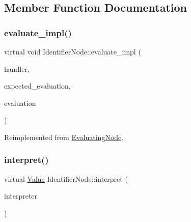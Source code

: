 \subsection{Member Function Documentation}
\mbox{\label{classIdentifierNode_a4960a1e68623066e413f8c2d68cee7e5}} 
\subsubsection{\texorpdfstring{evaluate\+\_\+impl()}{evaluate\_impl()}}
{\footnotesize\ttfamily virtual void Identifier\+Node\+::evaluate\+\_\+impl (\begin{DoxyParamCaption}\item[{\hyperlink{classSystemHandler}{System\+Handler} $\ast$}]{handler,  }\item[{\hyperlink{statics_8h_a6664c451ca7787483a7981cc1de68dbb}{E\+V\+A\+L\+U\+A\+T\+I\+O\+N\+\_\+\+T\+Y\+PE}}]{expected\+\_\+evaluation,  }\item[{struct \hyperlink{structEvaluation}{Evaluation} $\ast$}]{evaluation }\end{DoxyParamCaption})\hspace{0.3cm}{\ttfamily [virtual]}}



Reimplemented from \hyperlink{classEvaluatingNode_abb86fa7334a5871f959b0633db3b5215}{Evaluating\+Node}.

\mbox{\label{classIdentifierNode_aa7be7da3e018352f8b549fcac3a8155a}} 
\subsubsection{\texorpdfstring{interpret()}{interpret()}}
{\footnotesize\ttfamily virtual \hyperlink{classValue}{Value} Identifier\+Node\+::interpret (\begin{DoxyParamCaption}\item[{\hyperlink{classInterpreter}{Interpreter} $\ast$}]{interpreter }\end{DoxyParamCaption})\hspace{0.3cm}{\ttfamily [virtual]}}



